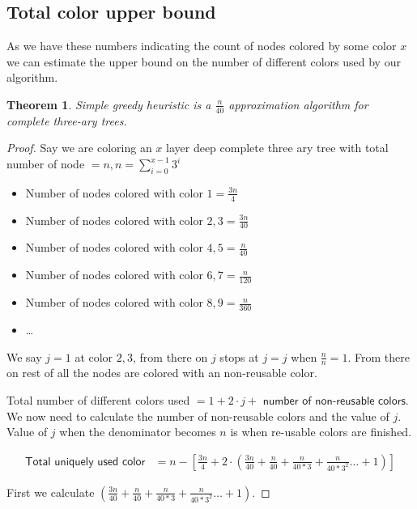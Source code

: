\documentclass{article}
\newtheorem{theorem}{Theorem}[section]
\theoremstyle{remark}
\begin{document}
\subsection{Total color upper bound}

As we have these numbers indicating the count of nodes colored by some color $x$ we can estimate the upper bound on the number of different colors used by our algorithm.

\begin{theorem}
    Simple greedy heuristic is a $\frac{n}{40}$ approximation algorithm for complete three-ary trees.
\end{theorem}

\begin{proof}
    Say we are coloring an $x$ layer deep complete three ary tree with total number of node $= n, n = \displaystyle\sum_{i = 0} ^{x - 1} 3^i$
    \begin{itemize}
        \item Number of nodes colored with color $1 = \frac{3n}{4}$
        \item Number of nodes colored with color $2, 3 = \frac{3n}{40}$
        \item Number of nodes colored with color $4, 5 = \frac{n}{40}$
        \item Number of nodes colored with color $6, 7 = \frac{n}{120}$
        \item Number of nodes colored with color $8, 9 = \frac{n}{360}$
        \item \dots
    \end{itemize}

    We say $j = 1$ at color $2, 3$, from there on $j$ stops at $j = j$ when $\frac{n}{n} = 1$. From there on rest of all the nodes are colored with an non-reusable color.

    Total number of different colors used $= 1 + 2\cdot j + \textsf{ number of non-reusable colors}$. We now need to calculate the number of non-reusable colors and the value of $j$. Value of $j$ when the denominator becomes $n$ is when re-usable colors are finished.

    \begin{align}
        \textsf{Total uniquely used color} &= n - \left[ \frac{3n}{4} + 2 \cdot \left( \frac{3n}{40} + \frac{n}{40} + \frac{n}{40 * 3} + \frac{n}{40 * 3^2} \dots + 1 \right)\right]
    \end{align}

    First we calculate $\left( \frac{3n}{40} + \frac{n}{40} + \frac{n}{40 * 3} + \frac{n}{40 * 3^2} \dots + 1 \right)$.


\end{proof}
\end{document}
